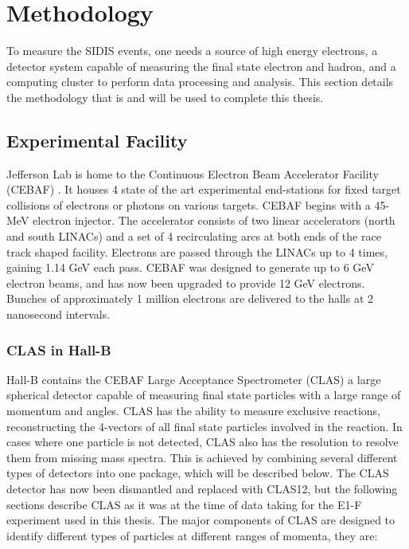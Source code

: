 \section{Methodology}
To measure the SIDIS events, one needs a source of high energy electrons, a detector system capable of measuring the final state electron and hadron, and a computing cluster to perform data processing and analysis.  This section details the methodology that is and will be used to complete this thesis.

\subsection{Experimental Facility}
Jefferson Lab is home to the Continuous Electron Beam Accelerator Facility (CEBAF) \cite{cebaf-leemann}.  It houses 4 state of the art experimental end-stations for fixed target collisions of electrons or photons on various targets.  CEBAF begins with a 45-MeV electron injector.  The accelerator consists of two linear accelerators (north and south LINACs) and a set of 4 recirculating arcs at both ends of the race track shaped facility.  Electrons are passed through the LINACs up to 4 times, gaining 1.14 GeV each pass.  CEBAF was designed to generate up to 6 GeV electron beams, and has now been upgraded to provide 12 GeV electrons. Bunches of approximately 1 million electrons are delivered to the halls at 2 nanosecond intervals.

\subsubsection{CLAS in Hall-B}
Hall-B contains the CEBAF Large Acceptance Spectrometer (CLAS) a large spherical detector capable of measuring final state particles with a large range of momentum and angles.  CLAS has the ability to measure exclusive reactions, reconstructing the 4-vectors of all final state particles involved in the reaction.  In cases where one particle is not detected, CLAS also has the resolution to resolve them from missing mass spectra.  This is achieved by combining several different types of detectors into one package, which will be described below.  The CLAS detector has now been dismantled and replaced with CLAS12, but the following sections describe CLAS as it was at the time of data taking for the E1-F experiment used in this thesis.  The major components of CLAS \cite{clas} are designed to identify different types of particles at different ranges of momenta, they are:

